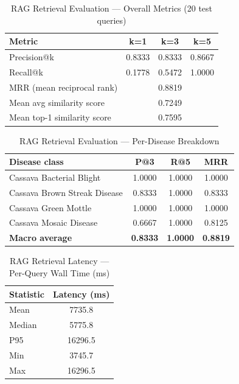 

\begin{table}[H]
\centering
\caption{RAG Retrieval Evaluation — Overall Metrics (20 test queries)}
\label{tab:rag_overall}
\begin{tabular}{lccc}
\hline
\textbf{Metric} & \textbf{k=1} & \textbf{k=3} & \textbf{k=5} \\
\hline
Precision@k & 0.8333 & 0.8333 & 0.8667 \\
Recall@k    & 0.1778 & 0.5472 & 1.0000 \\
\hline
MRR (mean reciprocal rank) & \multicolumn{3}{c}{0.8819} \\
Mean avg similarity score  & \multicolumn{3}{c}{0.7249} \\
Mean top-1 similarity score& \multicolumn{3}{c}{0.7595} \\
\hline
\end{tabular}
\end{table}

\begin{table}[H]
\centering
\caption{RAG Retrieval Evaluation — Per-Disease Breakdown}
\label{tab:rag_disease}
\begin{tabular}{lccc}
\hline
\textbf{Disease class} & \textbf{P@3} & \textbf{R@5} & \textbf{MRR} \\
\hline
Cassava Bacterial Blight & 1.0000 & 1.0000 & 1.0000 \\
Cassava Brown Streak Disease & 0.8333 & 1.0000 & 0.8333 \\
Cassava Green Mottle & 1.0000 & 1.0000 & 1.0000 \\
Cassava Mosaic Disease & 0.6667 & 1.0000 & 0.8125 \\
\hline
\textbf{Macro average} & \textbf{0.8333} & \textbf{1.0000} & \textbf{0.8819} \\
\hline
\end{tabular}
\end{table}

\begin{table}[H]
\centering
\caption{RAG Retrieval Latency — Per-Query Wall Time (ms)}
\label{tab:rag_latency}
\begin{tabular}{lc}
\hline
\textbf{Statistic} & \textbf{Latency (ms)} \\
\hline
Mean   & 7735.8 \\
Median & 5775.8 \\
P95    & 16296.5 \\
Min    & 3745.7 \\
Max    & 16296.5 \\
\hline
\end{tabular}
\end{table}
